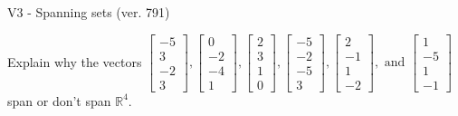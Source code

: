 \begin{exercise}
  \begin{exerciseTitle}V3 - Spanning sets (ver. 791)\end{exerciseTitle}
  \begin{exerciseStatement}
    Explain why the vectors \(\left[\begin{array}{r}
-5 \\
3 \\
-2 \\
3
\end{array}\right] , \left[\begin{array}{r}
0 \\
-2 \\
-4 \\
1
\end{array}\right] , \left[\begin{array}{r}
2 \\
3 \\
1 \\
0
\end{array}\right] , \left[\begin{array}{r}
-5 \\
-2 \\
-5 \\
3
\end{array}\right] , \left[\begin{array}{r}
2 \\
-1 \\
1 \\
-2
\end{array}\right] , \text{ and } \left[\begin{array}{r}
1 \\
-5 \\
1 \\
-1
\end{array}\right]\) span or don't span \(\mathbb{R}^4\). 
	



\end{exerciseStatement}
\end{exercise}
